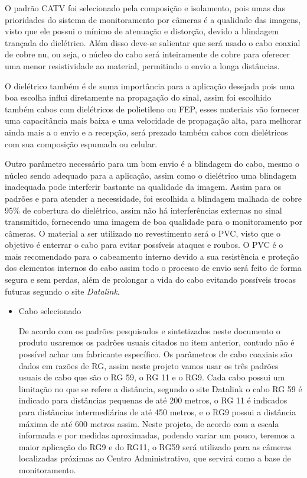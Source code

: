 	O padrão CATV foi selecionado pela composição e isolamento, pois umas das prioridades do sistema de monitoramento por câmeras é a qualidade das imagens, visto que ele possui o mínimo de atenuação e distorção, devido a blindagem trançada do dielétrico. Além disso deve-se salientar que será usado o cabo coaxial de cobre nu, ou seja, o núcleo do cabo será inteiramente de cobre para oferecer uma menor resistividade ao material, permitindo o envio a longa distâncias. 

	O dielétrico também é de suma importância para a aplicação desejada pois uma boa escolha influi diretamente na propagação do sinal, assim foi escolhido também cabos com dielétricos de polietileno ou FEP, esses materiais vão fornecer uma capacitância mais baixa e uma velocidade de propagação alta, para melhorar ainda mais a o envio e a recepção, será prezado também cabos com dielétricos com sua composição espumada ou celular.

	Outro parâmetro necessário para um bom envio é a blindagem do cabo, mesmo o núcleo sendo adequado para a aplicação, assim como o dielétrico uma blindagem inadequada pode interferir bastante na qualidade da imagem. Assim para os padrões e para atender a necessidade, foi escolhida a blindagem malhada de cobre 95\% de cobertura do dielétrico, assim não há interferências externas no sinal transmitido, fornecendo uma imagem de boa qualidade para o monitoramento por câmeras.
	O material a ser utilizado no revestimento será o PVC, visto que o objetivo é enterrar o cabo para evitar possíveis ataques e roubos. O PVC é o mais recomendado para o cabeamento interno devido a sua resistência e proteção dos elementos internos do cabo assim todo o processo de envio será feito de forma segura e sem perdas, além de prolongar a vida do cabo evitando possíveis trocas futuras segundo o site \textit{Datalink}. 

\begin{itemize}
	\item Cabo selecionado
	
	De acordo com os padrões pesquisados e sintetizados neste documento o produto usaremos os padrões usuais citados no item anterior, contudo não é possível achar um fabricante específico. Os parâmetros de cabo coaxiais são dados em razões de RG, assim neste projeto vamos usar os três padrões usuais de cabo que são o RG 59, o RG 11 e o RG9. Cada cabo possui um limitação no que se refere a distância, segundo o site Datalink o cabo  RG 59 é indicado para distâncias pequenas de até 200 metros, o RG 11 é indicados para distâncias intermediárias de até 450 metros, e o RG9 possui  a distância máxima de até 600 metros assim. Neste projeto, de acordo com a escala informada e por medidas aproximadas, podendo variar um pouco, teremos a maior aplicação do RG9 e do RG11, o RG59 será utilizado para as câmeras localizadas próximas  ao Centro Administrativo, que servirá como a base de monitoramento.
	
\end{itemize}

